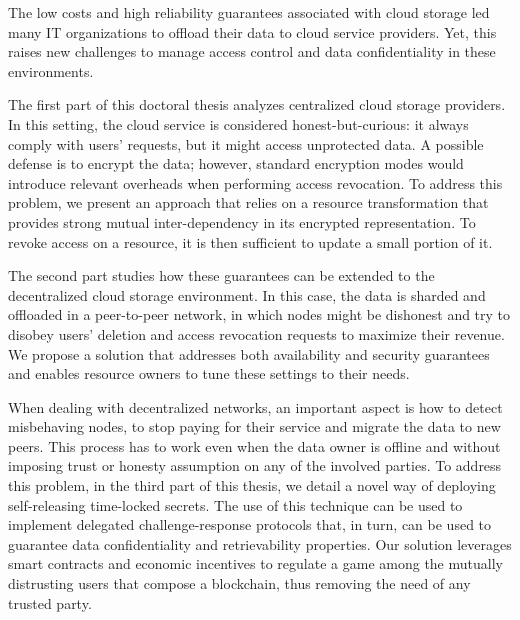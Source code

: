 The low costs and high reliability guarantees associated with cloud storage led
many IT organizations to offload their data to cloud service providers. Yet,
this raises new challenges to manage access control and data confidentiality in
these environments.

The first part of this doctoral thesis analyzes centralized cloud storage
providers. In this setting, the cloud service is considered honest-but-curious:
it always comply with users' requests, but it might access unprotected data. A
possible defense is to encrypt the data; however, standard encryption modes
would introduce relevant overheads when performing access revocation. To
address this problem, we present an approach that relies on a resource
transformation that provides strong mutual inter-dependency in its encrypted
representation. To revoke access on a resource, it is then sufficient to update
a small portion of it.

The second part studies how these guarantees can be extended to the
decentralized cloud storage environment. In this case, the data is sharded and
offloaded in a peer-to-peer network, in which nodes might be dishonest and try
to disobey users' deletion and access revocation requests to maximize their
revenue. We propose a solution that addresses both availability and security
guarantees and enables resource owners to tune these settings to their needs.

When dealing with decentralized networks, an important aspect is how to detect
misbehaving nodes, to stop paying for their service and migrate the data to new
peers. This process has to work even when the data owner is offline and without
imposing trust or honesty assumption on any of the involved parties. To address
this problem, in the third part of this thesis, we detail a novel way of
deploying self-releasing time-locked secrets. The use of this technique can be
used to implement delegated challenge-response protocols that, in turn, can be
used to guarantee data confidentiality and retrievability properties. Our
solution leverages smart contracts and economic incentives to regulate a game
among the mutually distrusting users that compose a blockchain, thus removing
the need of any trusted party.
